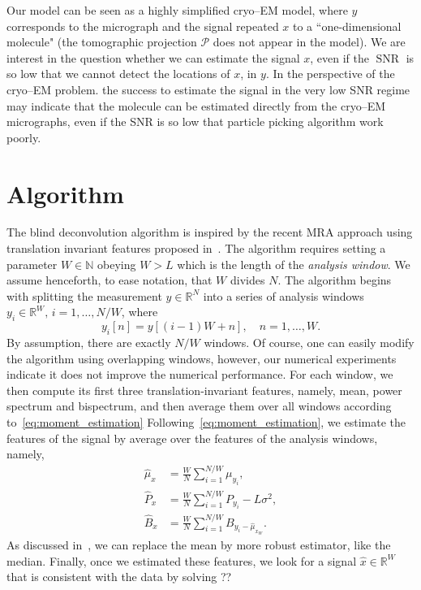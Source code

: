 \documentclass[journal]{IEEEtran}
\numberwithin{equation}{section}
\numberwithin{figure}{section}
\theoremstyle{plain}
\theoremstyle{definition}
\theoremstyle{remark}
\theoremstyle{plain}
\theoremstyle{remark}
\theoremstyle{plain}
\theoremstyle{plain}
\newcommand{\RN}{\mathbb{R}^N}
\newcommand{\SNR}{\operatorname{SNR}}
\begin{document}
 Our model can be seen as a highly simplified cryo--EM model, where $y$ corresponds to the micrograph and the signal repeated $x$ to a  ``one-dimensional molecule" (the tomographic projection $\mathcal{P}$ does not appear in the model). We are interest in the question whether we can estimate the signal $x$, even if the $\SNR$ is so low that we cannot detect the locations of $x$, in $y$. In the perspective of the cryo--EM problem. the success to estimate the signal in the very low SNR regime may indicate that the molecule can be estimated directly from the cryo--EM micrographs, even if the SNR is so low that particle picking algorithm work poorly. 



   

\section{Algorithm} \label{sec:algorithm}

The blind deconvolution algorithm is inspired by the recent MRA approach using translation invariant features proposed in~\cite{bendory2017bispectrum}. The algorithm requires setting a parameter $W\in\mathbb{N}$ obeying $W>L$  which is the length of the \emph{analysis window}. We assume henceforth, to ease notation, that $W$ divides $N$. 
The algorithm begins with splitting the measurement $y\in\RN$ into a series of analysis windows $y_i\in\mathbb{R}^W,\,i=1,\ldots,N/W$, where  
\begin{equation} \label{eq:analysis_window}
y_i[n] = y[(i-1)W + n] , \quad n=1,\ldots,W. 
\end{equation}
By assumption, there are exactly $N/W$ windows. Of course, one can easily modify the algorithm using overlapping windows, however, our numerical experiments indicate it does not improve the numerical performance.  For each window, we then compute its first three translation-invariant features, namely, mean, power spectrum and bispectrum, and then  average them over all windows according to~\eqref{eq:moment_estimation}
Following~\eqref{eq:moment_estimation}, we estimate the features of the signal by average over the features of the analysis windows, namely,
\begin{align} \label{eq:estimated_features_win}
\hat{\mu}_{x} &= \frac{W}{N}\sum_{i=1}^{N/W}\mu_{y_i}, \\ \nonumber
\hat{P}_{x} &= \frac{W}{N}\sum_{i=1}^{N/W}P_{y_i} - L\sigma^2, \\
\hat{B}_{x} &= \frac{W}{N}\sum_{i=1}^{N/W}B_{y_i-\hat{\mu}_{x_W}}.  \nonumber
\end{align}
As discussed in~\cite{bendory2017bispectrum}, we can replace the mean by more robust estimator, like the median.
 Finally, once we estimated these features, we look for a signal $\hat{x}\in\mathbb{R}^W$ that is consistent with the data by solving ??
\end{document}
